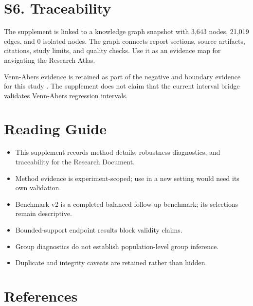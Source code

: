 \documentclass[11pt]{article}
\begin{document}
\section{S6. Traceability}

The supplement is linked to a knowledge graph snapshot with 3,643 nodes, 21,019 edges, and 0 isolated nodes. The graph connects report sections, source artifacts, citations, study limits, and quality checks. Use it as an evidence map for navigating the Research Atlas.

Venn-Abers evidence is retained as part of the negative and boundary evidence for this study \cite{nouretdinov2018ivapd}. The supplement does not claim that the current interval bridge validates Venn-Abers regression intervals.

\section{Reading Guide}

\begin{itemize}
\item This supplement records method details, robustness diagnostics, and traceability for the Research Document.
\item Method evidence is experiment-scoped; use in a new setting would need its own validation.
\item Benchmark v2 is a completed balanced follow-up benchmark; its selections remain descriptive.
\item Bounded-support endpoint results block validity claims.
\item Group diagnostics do not establish population-level group inference.
\item Duplicate and integrity caveats are retained rather than hidden.
\end{itemize}

\section{References}
\end{document}
